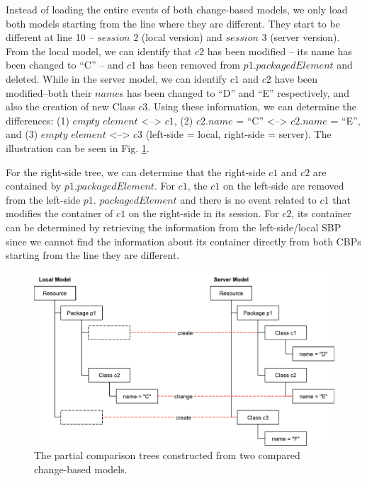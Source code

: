 \documentclass[sigplan,review,anonymous]{acmart}\settopmatter{printfolios=true,printccs=false,printacmref=false}
\begin{document}
Instead of loading the entire events of both change-based models, we only load both models starting from the line where they are different. They start to be different at line 10 -- $session$ $2$ (local version) and $session$ $3$ (server version). From the local model, we can identify that $c2$ has been modified -- its name has been changed to ``C'' -- and $c1$ has been removed from $p1$.$packagedElement$ and deleted. While in  the server model, we can identify $c1$ and $c2$ have been modified--both their $name$s has been changed to  ``D'' and ``E'' respectively, and also the creation of new Class $c3$. Using these information, we can determine the differences: (1) $empty$ $element$ <--> $c1$, (2) $c2$.$name$ = ``C'' <--> $c2$.$name$ = ``E'', and (3) $empty$ $element$ <--> $c3$ (left-side = local, right-side = server). The illustration can be seen in Fig. \ref{fig:comparison}.

For the right-side tree, we can determine that the right-side $c1$ and $c2$ are contained by $p1$.$packagedElement$. For $c1$, the $c1$ on the left-side are removed from the left-side $p1$. $packagedElement$ and there is no event related to $c1$ that modifies the container of $c1$ on the right-side in its session. For $c2$, its container can be determined by retrieving the information from the left-side/local SBP since we cannot find the information about its container directly from both CBPs starting from the line they are different. 

\begin{figure}
    \includegraphics[width=\linewidth]{images/comparison}
    \caption{The partial comparison trees constructed from two compared change-based models.}
    \label{fig:comparison}
\end{figure}

%
\end{document}
